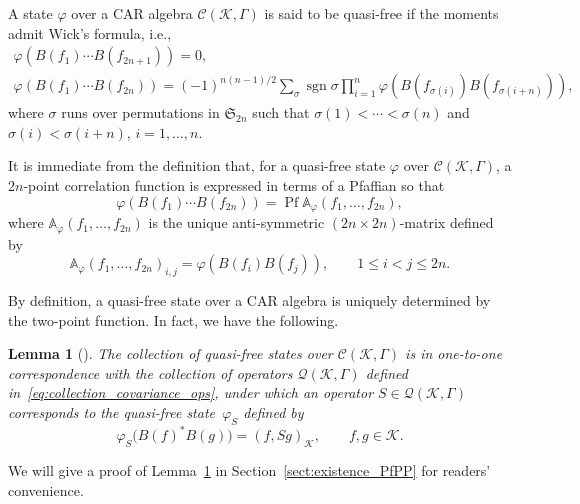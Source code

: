 \documentclass[pdftex]{sigma}
\numberwithin{equation}{section}
\newtheorem{Lemma}[Theorem]{Lemma}
\newcommand{\pf}{\operatorname{Pf}}
\newcommand{\mfrak}[1]{\mathfrak{#1}}
\newcommand{\mcal}[1]{\mathcal{#1}}
\newcommand{\mbb}[1]{\mathbb{#1}}
\begin{document}
\begin{Definition}A state $\varphi$ over a CAR algebra $\mcal{C}(\mcal{K},\Gamma)$ is said to be quasi-free if the moments admit Wick's formula, i.e.,
\begin{gather*}%
	\varphi (B(f_{1})\cdots B(f_{2n+1}) ) =0, \\
	\varphi (B(f_{1})\cdots B(f_{2n}) ) =(-1)^{n(n-1)/2}\sum_{\sigma}\operatorname{sgn} \sigma \prod_{i=1}^{n}\varphi (B(f_{\sigma (i)})B(f_{\sigma (i+n)}) ),
\end{gather*}
where $\sigma$ runs over permutations in $\mfrak{S}_{2n}$ such that $\sigma(1)<\cdots<\sigma (n)$ and $\sigma (i)<\sigma (i+n)$, $i=1,\dots, n$.
\end{Definition}

It is immediate from the definition that, for a quasi-free state $\varphi$ over $\mcal{C}(\mcal{K},\Gamma)$, a $2n$-point correlation function is expressed in terms of a Pfaffian so that
\begin{equation*}
	\varphi (B(f_{1})\cdots B(f_{2n}) )=\pf \mbb{A}_{\varphi}(f_{1},\dots, f_{2n}),
\end{equation*}
where $\mbb{A}_{\varphi}(f_{1},\dots, f_{2n})$ is the unique anti-symmetric $(2n\times 2n)$-matrix defined by
\begin{equation*}
	\mbb{A}_{\varphi}(f_{1},\dots, f_{2n})_{i,j}=\varphi (B(f_{i})B(f_{j}) ),\qquad 1\le i <j \le 2n.
\end{equation*}

By definition, a quasi-free state over a CAR algebra is uniquely determined by the two-point function. In fact, we have the following.
\begin{Lemma}[\cite{Araki1970}]\label{lem:quasi-free_covariance}
The collection of quasi-free states over $\mcal{C}(\mcal{K},\Gamma)$ is in one-to-one correspondence with the collection of operators $\mcal{Q}(\mcal{K},\Gamma)$ defined in~\eqref{eq:collection_covariance_ops}, under which an operator $S\in\mcal{Q}(\mcal{K},\Gamma)$ corresponds to the quasi-free state~$\varphi_{S}$ defined by
\begin{equation*}%
	\varphi_{S}\big(B(f)^{\ast}B(g)\big)=(f,Sg)_{\mcal{K}},\qquad f,g\in\mcal{K}.
\end{equation*}
\end{Lemma}
We will give a proof of Lemma~\ref{lem:quasi-free_covariance} in Section~\ref{sect:existence_PfPP} for readers' convenience.
\end{document}
